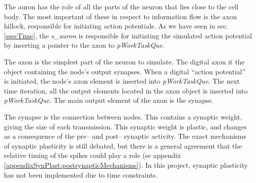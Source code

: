 		The auron has the role of all the parts of the neuron that lies close to the cell body. 
		The most important of these in respect to information flow is the axon hillock, responsible for initiating action potentials.
		As we have seen in sec. \ref{ssecTime}, the \emph{s\_auron} is responsible for initiating the simulated action potential   by inserting a pointer to the axon to \emph{pWorkTaskQue}. %

		The axon is the simplest part of the neuron to simulate.
		The digital axon it the object containing the node's output synapses.
		When a digital ``action potential'' is initiated, the node's axon element is inserted into \emph{pWorkTaskQue}.
		The next time iteration, all the output elements located in the axon object is inserted into \emph{pWorkTaskQue}.
		The main output element of the axon is the synapse.

		The synapse is the connection between nodes. This contains a synaptic weight, giving the size of each transmission.
		This synaptic weight is plastic, and changes as a consequence of the pre-- and post-- synaptic activity.
		The exact mechanisms of synaptic plasticity is still debated, but there is a general agreement that the relative timing of the spikes could play a role (se appendix \ref{appendixSynPlast:postsynapticMechanisms}).
		In this project, synaptic plasticity has not been implemented due to time constraints.






